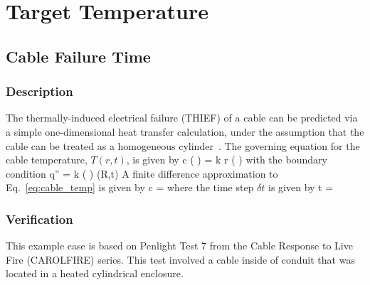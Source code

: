 
\chapter{Target Temperature}
\label{Target_Temperature_Chapter}

\section{Cable Failure Time}

\subsection*{Description}

The thermally-induced electrical failure (THIEF) of a cable can be predicted via a simple
one-dimensional heat transfer calculation, under the assumption that the cable can be
treated as a homogeneous cylinder~\cite{CAROLFIRE}. The governing equation for the cable temperature,
$T(r,t)$, is given by
\be
\rho c \left(  \right) =   k r \left(  \right)
\label{eq:cable_temp}
\ee
with the boundary condition
\be
\dot q'' = k \left(  \right) (R,t)
\ee
A finite difference approximation to Eq.~\ref{eq:cable_temp} is given by
\be
\rho c  =   
\ee
where the time step $\delta t$ is given by
\be
\delta t = 
\ee


\clearpage


\subsection*{Verification}

This example case is based on Penlight Test 7 from the Cable Response to Live Fire (CAROLFIRE) series. This test involved a cable inside of conduit that was located in a heated cylindrical enclosure.

